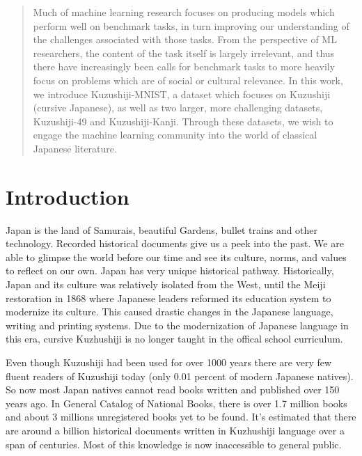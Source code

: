 \documentclass[12pt]{report}
\begin{document}
 
 
\begin{abstract}
Much of machine learning research focuses on producing models which perform
well on benchmark tasks, in turn improving our understanding of the challenges
associated with those tasks. From the perspective of ML researchers, the content of
the task itself is largely irrelevant, and thus there have increasingly been calls for
benchmark tasks to more heavily focus on problems which are of social or cultural
relevance. In this work, we introduce Kuzushiji-MNIST, a dataset which focuses
on
Kuzushiji
(cursive Japanese), as well as two larger, more challenging datasets,
Kuzushiji-49 and Kuzushiji-Kanji. Through these datasets, we wish to engage the
machine learning community into the world of classical Japanese literature.

\end{abstract}

\tableofcontents
\listoffigures

\chapter {Introduction}
\label{intro}

\setlength{\parindent}{10ex}Japan is the land of Samurais, beautiful Gardens, bullet trains and
other technology. Recorded historical documents give us a peek into the past. We are able to glimpse the world before
our time and see its culture, norms, and values to reflect on our own. Japan has very unique historical
pathway.  Historically, Japan and its culture was relatively isolated from the West, until the Meiji
restoration in 1868 where Japanese leaders reformed its education system to modernize its culture.
This caused drastic changes in the Japanese language, writing and printing systems.  Due to the
modernization of Japanese language in this era, cursive Kuzhushiji is no longer taught in the offical
school curriculum.

Even though Kuzushiji had been used for over 1000 years there are very few fluent
readers of Kuzushiji today (only 0.01 percent of modern Japanese natives). So now most Japan natives cannot
read books written and published over 150 years ago. In General Catalog of National
Books, there is over 1.7 million books and about 3 millions unregistered books yet to be found. It's estimated
that there are around a billion historical documents written in Kuzhushiji language over a span of centuries. Most of
this knowledge is now inaccessible to general public.
\end{document}

